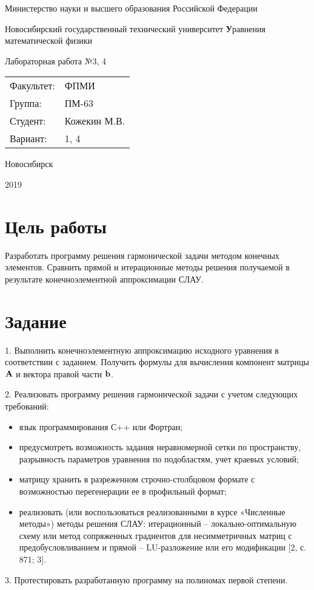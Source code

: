 \documentclass[12pt, a4paper]{article}
\newcommand{\insertTitle}[6]{
\begin{titlepage}
	\begin{center}
    	\large
		Министерство науки и высшего образования Российской Федерации
		
		Новосибирский государственный технический университет
		\vfill
		{\textbf #1}
		
		Лабораторная работа №#2
		\vfill
	\end{center}
	
	\begin{tabular}{ m{7em}  m{7em} }
	Факультет: & ФПМИ \\ 
	Группа: & #3 \\  
	Студент: & #4 \\
	Вариант: & #5
	\end{tabular}
	\vfill

\begin{center}
Новосибирск

#6
\end{center}
\end{titlepage}
}
\begin{document}
\setlength{\abovedisplayskip}{1pt}
\setlength{\belowdisplayskip}{1pt}


\insertTitle{Уравнения математической физики}{3, 4}{ПМ-63}{Кожекин М.В.}{1, 4}{2019}


\section{Цель работы}
Разработать программу решения гармонической задачи методом конечных элементов. Сравнить прямой и итерационные методы решения получаемой в результате конечноэлементной аппроксимации СЛАУ.


\section{Задание}

1.	Выполнить конечноэлементную аппроксимацию исходного уравнения в соответствии с заданием. Получить формулы для вычисления компонент матрицы ${\bf A}$ и вектора правой части ${\bf b}$. 

2.	Реализовать программу решения гармонической задачи с учетом следующих требований:
\begin{itemize}[noitemsep]
\item язык программирования С++ или Фортран;
\item предусмотреть возможность задания неравномерной сетки по пространству, разрывность параметров уравнения по подобластям, учет краевых условий;
\item матрицу хранить в разреженном строчно-столбцовом формате с возможностью перегенерации ее в профильный формат; 
\item реализовать (или воспользоваться реализованными в курсе «Численные методы») методы решения СЛАУ: итерационный – локально-оптимальную схему или метод сопряженных градиентов для несимметричных матриц с предобусловливанием и прямой – LU-разложение или его модификации [2, с. 871; 3].
\end{itemize}

3.	Протестировать разработанную программу на полиномах первой степени.
\end{document}
